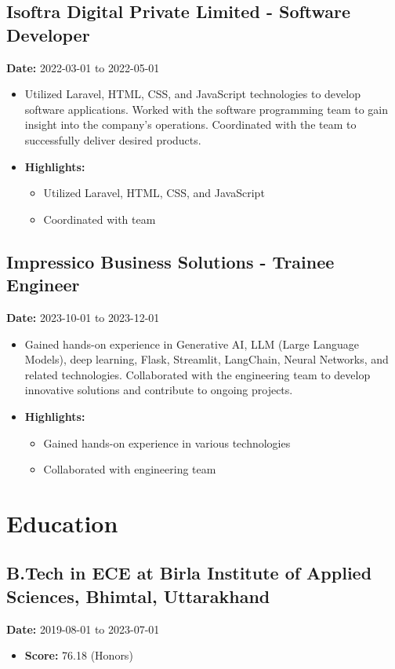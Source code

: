\documentclass{article}
\begin{document}
\subsection{Isoftra Digital Private Limited - Software Developer}
\textbf{Date:} 2022-03-01 to 2022-05-01
\begin{itemize}[label=-]
\item Utilized Laravel, HTML, CSS, and JavaScript technologies to develop software applications. Worked with the software programming team to gain insight into the company's operations. Coordinated with the team to successfully deliver desired products.
\item \textbf{Highlights:}
\begin{itemize}[label=--]
\item Utilized Laravel, HTML, CSS, and JavaScript
\item Coordinated with team
\end{itemize}
\end{itemize}

\subsection{Impressico Business Solutions - Trainee Engineer}
\textbf{Date:} 2023-10-01 to 2023-12-01
\begin{itemize}[label=-]
\item Gained hands-on experience in Generative AI, LLM (Large Language Models), deep learning, Flask, Streamlit, LangChain, Neural Networks, and related technologies. Collaborated with the engineering team to develop innovative solutions and contribute to ongoing projects.
\item \textbf{Highlights:}
\begin{itemize}[label=--]
\item Gained hands-on experience in various technologies
\item Collaborated with engineering team
\end{itemize}
\end{itemize}

\section{Education}
\subsection{B.Tech in ECE at Birla Institute of Applied Sciences, Bhimtal, Uttarakhand}
\textbf{Date:} 2019-08-01 to 2023-07-01
\begin{itemize}[label=-]
\item \textbf{Score:} 76.18 (Honors)
\end{itemize}
\end{document}
